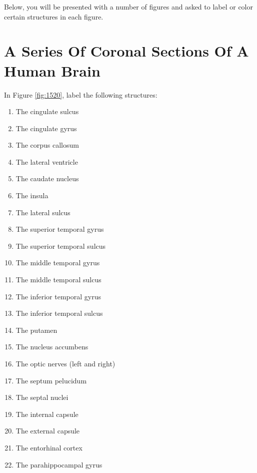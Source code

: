 \documentclass[]{book}
\providecommand{\tightlist}{%
  \setlength{\itemsep}{0pt}\setlength{\parskip}{0pt}}
\begin{document}
Below, you will be presented with a number of figures and asked to label or color certain structures in each figure.

\hypertarget{a-series-of-coronal-sections-of-a-human-brain}{%
\section{A Series Of Coronal Sections Of A Human Brain}\label{a-series-of-coronal-sections-of-a-human-brain}}

In Figure \ref{fig:1520}, label the following structures:

\begin{enumerate}
\def\labelenumi{\arabic{enumi}.}
\tightlist
\item
  The cingulate sulcus
\item
  The cingulate gyrus
\item
  The corpus callosum
\item
  The lateral ventricle
\item
  The caudate nucleus
\item
  The insula
\item
  The lateral sulcus
\item
  The superior temporal gyrus
\item
  The superior temporal sulcus
\item
  The middle temporal gyrus
\item
  The middle temporal sulcus
\item
  The inferior temporal gyrus
\item
  The inferior temporal sulcus
\item
  The putamen
\item
  The nucleus accumbens
\item
  The optic nerves (left and right)
\item
  The septum pelucidum
\item
  The septal nuclei
\item
  The internal capsule
\item
  The external capsule
\item
  The entorhinal cortex
\item
  The parahippocampal gyrus
\end{enumerate}
\end{document}
